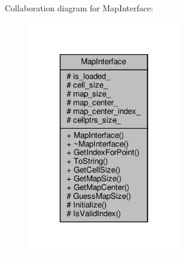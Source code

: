 Collaboration diagram for Map\+Interface\+:\nopagebreak
\begin{figure}[H]
\begin{center}
\leavevmode
\includegraphics[width=190pt]{db/d2d/classMapInterface__coll__graph}
\end{center}
\end{figure}
